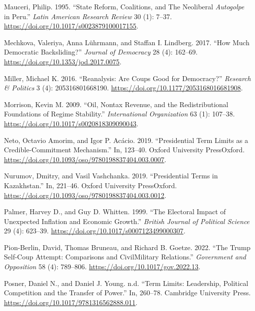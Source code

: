 \documentclass[
  12pt,
]{report}
\newlength{\cslhangindent}
\newenvironment{CSLReferences}[2] %
 {\begin{list}{}{%
  \setlength{\itemindent}{0pt}
  \setlength{\leftmargin}{0pt}
  \setlength{\parsep}{0pt}
  \ifodd #1
   \setlength{\leftmargin}{\cslhangindent}
   \setlength{\itemindent}{-1\cslhangindent}
  \fi
  \setlength{\itemsep}{#2\baselineskip}}}
 {\end{list}}
\begin{document}
\begin{CSLReferences}{1}{0}
Mauceri, Philip. 1995. {``State Reform, Coalitions, and The Neoliberal
{\emph{Autogolpe}} in Peru.''} \emph{Latin American Research Review} 30
(1): 7--37. \url{https://doi.org/10.1017/s0023879100017155}.

Mechkova, Valeriya, Anna Lührmann, and Staffan I. Lindberg. 2017. {``How
Much Democratic Backsliding?''} \emph{Journal of Democracy} 28 (4):
162--69. \url{https://doi.org/10.1353/jod.2017.0075}.

Miller, Michael K. 2016. {``Reanalysis: Are Coups Good for Democracy?''}
\emph{Research \& Politics} 3 (4): 205316801668190.
\url{https://doi.org/10.1177/2053168016681908}.

Morrison, Kevin M. 2009. {``Oil, Nontax Revenue, and the
Redistributional Foundations of Regime Stability.''} \emph{International
Organization} 63 (1): 107--38.
\url{https://doi.org/10.1017/s0020818309090043}.

Neto, Octavio Amorim, and Igor P. Acácio. 2019. {``Presidential Term
Limits as a Credible-Commitment Mechanism.''} In, 123--40. Oxford
University PressOxford.
\url{https://doi.org/10.1093/oso/9780198837404.003.0007}.

Nurumov, Dmitry, and Vasil Vashchanka. 2019. {``Presidential Terms in
Kazakhstan.''} In, 221--46. Oxford University PressOxford.
\url{https://doi.org/10.1093/oso/9780198837404.003.0012}.

Palmer, Harvey D., and Guy D. Whitten. 1999. {``The Electoral Impact of
Unexpected Inflation and Economic Growth.''} \emph{British Journal of
Political Science} 29 (4): 623--39.
\url{https://doi.org/10.1017/s0007123499000307}.

Pion-Berlin, David, Thomas Bruneau, and Richard B. Goetze. 2022. {``The
Trump Self-Coup Attempt: Comparisons and Civil{\textendash}Military
Relations.''} \emph{Government and Opposition} 58 (4): 789--806.
\url{https://doi.org/10.1017/gov.2022.13}.

Posner, Daniel N., and Daniel J. Young. n.d. {``Term Limits: Leadership,
Political Competition and the Transfer of Power.''} In, 260--78.
Cambridge University Press.
\url{https://doi.org/10.1017/9781316562888.011}.


\end{CSLReferences}
\end{document}
